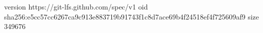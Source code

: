 version https://git-lfs.github.com/spec/v1
oid sha256:e5cc57cc6267ca9c913e883719b91743f1c8d7ace69b4f24518ef4f725609af9
size 349676
